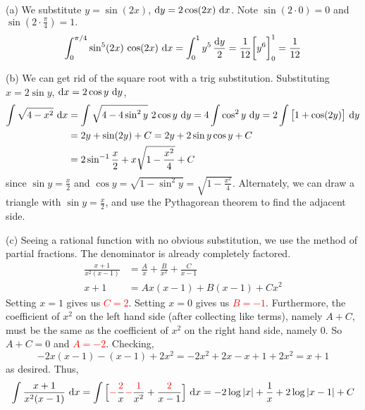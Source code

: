 \begin{solution} (a)
We substitute $y=\sin(2x)$, $\mathrm{d}y=2\cos(2x)\ \mathrm{d}x$. Note $\sin(2\cdot 0)=0$ and $\sin(2\cdot\frac{\pi}{4}) = 1.$
\begin{equation*}
\int_0^{\pi/4}\sin^5(2x)\,\cos(2x)\ \mathrm{d}x
=\int_{0}^{1} y^5\,\frac{\mathrm{d}y}{2}
=\frac{1}{12}\bigg[y^6\bigg]_0^1
=\frac{1}{12}
\end{equation*}

\noindent (b) We can get rid of the square root with a trig substitution.
Substituting $x=2\sin y$, $\mathrm{d}x=2\cos y\ \mathrm{d}y$,
\begin{align*}
\int\sqrt{4-x^2}\ \mathrm{d}x
&=\int \sqrt{4-4\sin^2 y}\ 2\cos y\ \mathrm{d}y
=4\int \cos^2y\ \mathrm{d}y
=2\int\big[1+\cos(2y)\big]\ \mathrm{d}y \\
&=2 y +\sin(2y)+C
=2y+2\sin y\cos y+C \\
&=2\sin^{-1}\frac{x}{2}+x\sqrt{1-\frac{x^2}{4}}+C
\end{align*}
since $\sin y =\frac{x}{2}$ and $\cos y=\sqrt{1-\sin^2y}
=\sqrt{1-\frac{x^2}{4}}$. Alternately, we can draw a triangle with $\sin y = \frac{x}{2}$, and use the Pythagorean theorem to find the adjacent side.
\begin{center}
\end{center}


\noindent (c)
Seeing a rational function with no obvious substitution, we use the method of partial fractions. The denominator is already completely factored.
\begin{align*}
\frac{x+1}{x^2(x-1)}&=\frac{A}{x}+\frac{B}{x^2}+\frac{C}{x-1}\\
x+1&=Ax(x-1)+B(x-1)+Cx^2
\end{align*}
Setting $x=1$ gives us \textcolor{red}{$C=2$}.
Setting $x=0$ gives us \textcolor{red}{$B=-1$}. Furthermore,  the coefficient
of $x^2$ on the left hand side (after collecting like terms), namely $A+C$, must be the same as
the  coefficient of $x^2$ on the right hand side, namely $0$.
So $A+C=0$ and \textcolor{red}{$A=-2$}.
Checking,
\begin{equation*}
-2x(x-1)-(x-1)+2x^2=-2x^2+2x-x+1+2x^2=x+1
\end{equation*}
as desired. Thus,
\begin{equation*}
\int\frac{x+1}{x^2(x-1)}\ \dee{x}
=\int\Big[\textcolor{red}{-}\frac{\textcolor{red}{2}}{x}\textcolor{red}{-}\frac{\textcolor{red}{1}}{x^2}+\frac{\textcolor{red}{2}}{x-1}\Big]\ \dee{x}
=-2\log|x|+\frac{1}{x}+2\log|x-1|+C
\end{equation*}




\end{solution}



